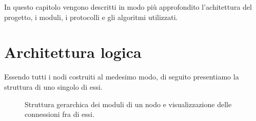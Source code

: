 \documentclass{memoir}
\begin{document}
In questo capitolo vengono descritti in modo più approfondito l'achitettura del
	   progetto, i moduli, i protocolli e gli algoritmi utilizzati.

\section{Architettura logica}

Essendo tutti i nodi costruiti al medesimo modo, di seguito presentiamo la struttura
	   di uno singolo di essi. 

\begin{figure}[h]
\caption{Struttura gerarchica dei moduli di un nodo e visualizzazione delle connessioni
	   fra di essi.}
\label{img:struttura_nodo}
\end{figure}
\end{document}
